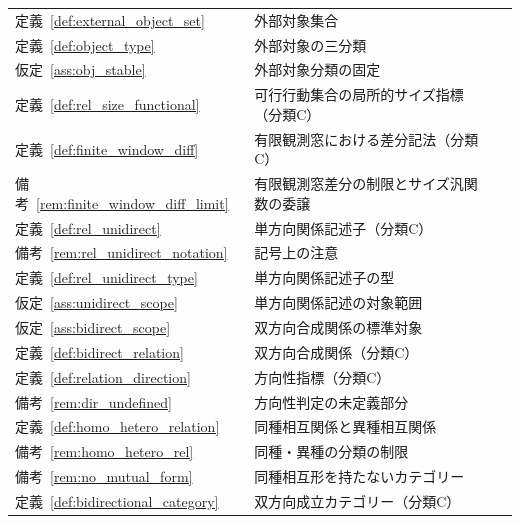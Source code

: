 \begingroup
\small
\setlength{\tabcolsep}{4pt}
\renewcommand{\arraystretch}{1.12}
\begin{longtable}{p{2.4cm} p{10.4cm} r}
定義~\ref{def:external_object_set} & 外部対象集合 & \pageref{def:external_object_set} \\
定義~\ref{def:object_type} & 外部対象の三分類 & \pageref{def:object_type} \\
仮定~\ref{ass:obj_stable} & 外部対象分類の固定 & \pageref{ass:obj_stable} \\
定義~\ref{def:rel_size_functional} & 可行行動集合の局所的サイズ指標（分類C） & \pageref{def:rel_size_functional} \\
定義~\ref{def:finite_window_diff} & 有限観測窓における差分記法（分類C） & \pageref{def:finite_window_diff} \\
備考~\ref{rem:finite_window_diff_limit} & 有限観測窓差分の制限とサイズ汎関数の委譲 & \pageref{rem:finite_window_diff_limit} \\
定義~\ref{def:rel_unidirect} & 単方向関係記述子（分類C） & \pageref{def:rel_unidirect} \\
備考~\ref{rem:rel_unidirect_notation} & 記号上の注意 & \pageref{rem:rel_unidirect_notation} \\
定義~\ref{def:rel_unidirect_type} & 単方向関係記述子の型 & \pageref{def:rel_unidirect_type} \\
仮定~\ref{ass:unidirect_scope} & 単方向関係記述の対象範囲 & \pageref{ass:unidirect_scope} \\
仮定~\ref{ass:bidirect_scope} & 双方向合成関係の標準対象 & \pageref{ass:bidirect_scope} \\
定義~\ref{def:bidirect_relation} & 双方向合成関係（分類C） & \pageref{def:bidirect_relation} \\
定義~\ref{def:relation_direction} & 方向性指標（分類C） & \pageref{def:relation_direction} \\
備考~\ref{rem:dir_undefined} & 方向性判定の未定義部分 & \pageref{rem:dir_undefined} \\
定義~\ref{def:homo_hetero_relation} & 同種相互関係と異種相互関係 & \pageref{def:homo_hetero_relation} \\
備考~\ref{rem:homo_hetero_rel} & 同種・異種の分類の制限 & \pageref{rem:homo_hetero_rel} \\
備考~\ref{rem:no_mutual_form} & 同種相互形を持たないカテゴリー & \pageref{rem:no_mutual_form} \\
定義~\ref{def:bidirectional_category} & 双方向成立カテゴリー（分類C） & \pageref{def:bidirectional_category} \\

\end{longtable}
